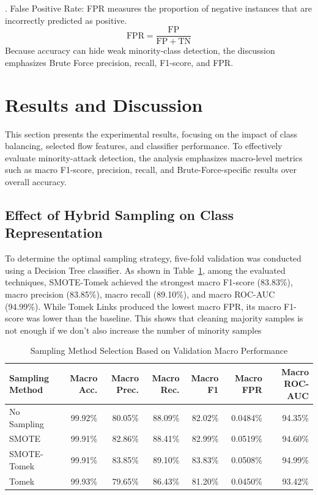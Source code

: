 \documentclass[conference,a4paper]{IEEEtran}
\begin{document}
\noindent{}. False Positive Rate: FPR measures the proportion of negative instances that are incorrectly predicted as positive.
\begin{equation}
\mathrm{FPR} = \frac{\mathrm{FP}}{\mathrm{FP}+\mathrm{TN}}
\label{eq:fpr}
\end{equation}
Because accuracy can hide weak minority-class detection, the discussion emphasizes Brute Force precision, recall, F1-score, and FPR.

\FloatBarrier

\section{Results and Discussion}

This section presents the experimental results, focusing on the impact of class balancing, selected flow features, and classifier performance. To effectively evaluate minority-attack detection, the analysis emphasizes macro-level metrics such as macro F1-score, precision, recall, and Brute-Force-specific results over overall accuracy.

\subsection{Effect of Hybrid Sampling on Class Representation}

To determine the optimal sampling strategy, five-fold validation was conducted using a Decision Tree classifier. As shown in Table~\ref{tab:sampling_selection_macro}, among the evaluated techniques, SMOTE-Tomek achieved the strongest macro F1-score (83.83\%), macro precision (83.85\%), macro recall (89.10\%), and macro ROC-AUC (94.99\%). While Tomek Links produced the lowest macro FPR, its macro F1-score was lower than the baseline. This shows that cleaning majority samples is not enough if we don't also increase the number of minority samples

\begin{table}[!t]
\caption{Sampling Method Selection Based on Validation Macro Performance}
\label{tab:sampling_selection_macro}
\centering
\footnotesize
\renewcommand{\arraystretch}{1.15}
\setlength{\tabcolsep}{3pt}
\begin{tabular}{|l|r|r|r|r|r|r|}
\hline
\textbf{Sampling Method} & \textbf{Macro Acc.} & \textbf{Macro Prec.} & \textbf{Macro Rec.} & \textbf{Macro F1} & \textbf{Macro FPR} & \textbf{Macro ROC-AUC} \\
\hline
No Sampling & 99.92\% & 80.05\% & 88.09\% & 82.02\% & 0.0484\% & 94.35\% \\
\hline
SMOTE & 99.91\% & 82.86\% & 88.41\% & 82.99\% & 0.0519\% & 94.60\% \\
\hline
SMOTE-Tomek & 99.91\% & 83.85\% & 89.10\% & 83.83\% & 0.0508\% & 94.99\% \\
\hline
Tomek & 99.93\% & 79.65\% & 86.43\% & 81.20\% & 0.0450\% & 93.42\% \\
\hline
\end{tabular}
\end{table}
\end{document}
